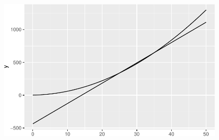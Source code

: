 \documentclass[
  letterpaper,
  DIV=11,
  numbers=noendperiod]{scrartcl}
\begin{document}
\begin{figure}[H]

{\centering \includegraphics{a1template_files/figure-pdf/unnamed-chunk-7-1.pdf}

}

\end{figure}
\end{document}
